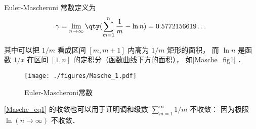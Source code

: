 
\begin{issues}
\issueDraft
\end{issues}


Euler-Mascheroni 常数定义为
\begin{equation}\label{Masche_eq1}
\gamma = \lim_{n\to\infty} \qty(\sum_{m=1}^n \frac{1}{m} - \ln n) = 0.5772156619\dots
\end{equation}

其中可以把 $1/m$ 看成区间 $[m, m+1]$ 内高为 $1/m$ 矩形的面积， 而 $\ln n$ 是函数 $1/x$ 在区间 $[1,n]$ 的定积分（函数曲线下方的面积）， 如\autoref{Masche_fig1} ．

\begin{figure}[ht]
\centering
\texttt{[image: ./figures/Masche\_1.pdf]}
\caption{Euler-Mascheroni常数} \label{Masche_fig1}
\end{figure}

\autoref{Masche_eq1} 的收敛也可以用于证明调和级数 $\sum_{m=1}^\infty 1/m$ 不收敛： 因为极限 $\ln(n\to\infty)$ 不收敛．

